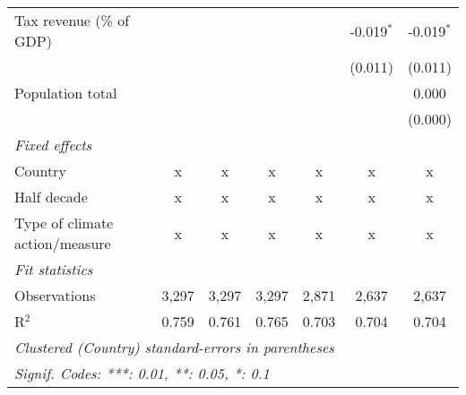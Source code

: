 \begin{tabular}{lcccccc}
   Tax revenue (\% of GDP)                        &         &         &               &               & -0.019$^{*}$  & -0.019$^{*}$\\   
                                                  &         &         &               &               & (0.011)       & (0.011)\\   
   Population total                               &         &         &               &               &               & 0.000\\   
                                                  &         &         &               &               &               & (0.000)\\   
   \emph{Fixed effects}\\
   Country                                        & x       & x       & x             & x             & x             & x\\  
   Half decade                                    & x       & x       & x             & x             & x             & x\\  
   Type of climate action/measure                 & x       & x       & x             & x             & x             & x\\  
   \midrule \emph{Fit statistics}\\
   Observations                                   & 3,297   & 3,297   & 3,297         & 2,871         & 2,637         & 2,637\\  
   R$^2$                                          & 0.759   & 0.761   & 0.765         & 0.703         & 0.704         & 0.704\\  
   \midrule
   \multicolumn{7}{l}{\emph{Clustered (Country) standard-errors in parentheses}}\\
   \multicolumn{7}{l}{\emph{Signif. Codes: ***: 0.01, **: 0.05, *: 0.1}}\\
\end{tabular}
\par\endgroup


